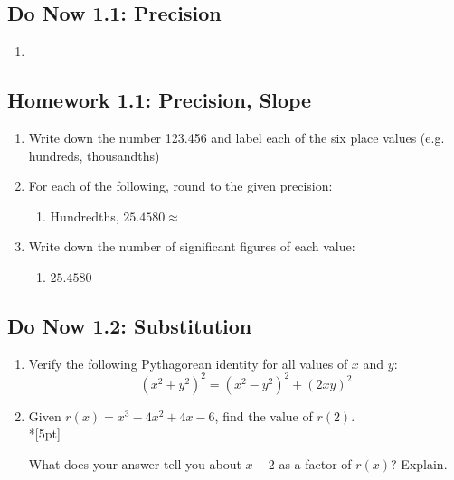 \documentclass[12pt, oneside]{article}
\begin{document}
\subsection*{Do Now 1.1: Precision}
\begin{enumerate}
  \item
\end{enumerate}


\subsection*{Homework 1.1: Precision, Slope}

\begin{enumerate}
  \item Write down the number 123.456 and label each of the six place values (e.g. hundreds, thousandths)\\[2in]
  \item For each of the following, round to the given precision:
  \begin{enumerate}
    \item Hundredths, $25.4580 \approx$
  \end{enumerate}
  \item Write down the number of significant figures of each value:
  \begin{enumerate}
    \item $25.4580$
  \end{enumerate}

\end{enumerate}

\newpage
\subsection*{Do Now 1.2: Substitution}
\begin{enumerate}

  \emph{Spicy}
  \item %
  Verify the following Pythagorean identity for all values of $x$ and $y$:
  \[(x^2+y^2)^2=(x^2-y^2)^2+(2xy)^2\]

  \item %
  Given $r(x) = x^3  - 4x^2 +4x -6$, find the value of $r(2)$.\\*[5pt]

  What does your answer tell you about $x - 2$ as a factor of $r(x)$? Explain.

\end{enumerate}
\end{document}
